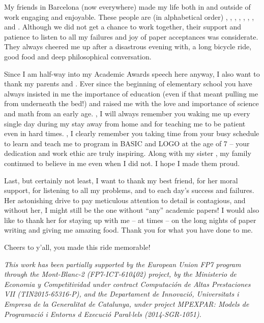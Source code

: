 \begin{acknowledgements}
     My friends in Barcelona (now everywhere) made my life both in and
    outside of work engaging and enjoyable. These people are (in alphabetical order)
    , , , , , , ,  and .  Although we did not get a chance to work
    together, their support and patience to listen to all my failures and joy of
    paper acceptances was considerate.  They always cheered me up after a disastrous
    evening with, a long bicycle ride, good food and deep philosophical conversation.

     Since I am half-way into my Academic Awards speech here anyway, I also
    want to thank my parents  and  .  Ever
    since the beginning of elementary school you have always insisted in me the
    importance of education (even if that meant pulling me from underneath the bed!) and
    raised me with the love and importance of science and math from an early age.
    , I will always remember you waking me up every single day 
    during my stay away from home and for teaching me to be patient even in hard times.
    , I clearly remember you taking time from your busy schedule to learn
    and teach me to program in BASIC and LOGO at the age of 7 -- your dedication and work
    ethic are truly inspiring. Along with my sister , my family
    continued to believe in me even when I did not. I hope I made them proud.
    
     Last, but certainly not least, I want to thank my best friend,
     for her moral support, for listening to all my problems, and
    to each day's success and failures.  Her astonishing drive to pay meticulous attention
    to detail is contagious, and without her, I might still be the one without ``any''
    academic papers! I would also like to thank her for staying up with me -- at times --
    on the long nights of paper writing and giving me amazing food. Thank you for what you
    have done to me.
    
    Cheers to y'all, you made this ride memorable!  
    
    \vspace{2mm}
    
    \textit{This work has been partially supported by the European Union FP7 program
    through the Mont-Blanc-2 (FP7-ICT-610402) project, by the Ministerio de Economia y
    Competitividad under contract Computaci\'on de Altas Prestaciones VII
    (TIN2015-65316-P), and the Departament de Innovaci\'o, Universitats i Empresa de la
    Generalitat de Catalunya, under project MPEXPAR: Models de Programaci\'o i Entorns d
    Execuci\'o Paral$\cdot$lels (2014-SGR-1051).}
    

\end{acknowledgements}
